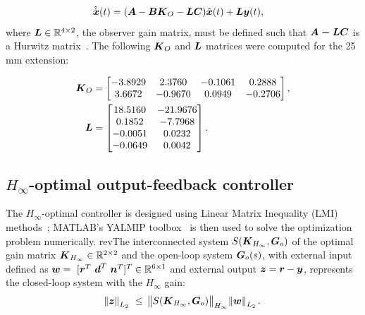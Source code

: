 \begin{align}
&\hat{\dot{\boldsymbol{x}}}(t)=(\boldsymbol{A}-\boldsymbol{B}\boldsymbol{K}_O-\boldsymbol{LC})\hat{\boldsymbol{x}}(t)+\boldsymbol{L}\boldsymbol{y}(t), \label{eq:obs-estimate}
\end{align}
where $\boldsymbol{L}\in \mathbb{R}^{4\times2}$, the observer gain matrix, must be defined such that $\boldsymbol{A-LC}$ is a Hurwitz matrix~\cite{Aastrom2010}.
The following $\boldsymbol{K}_O$ and $\boldsymbol{L}$ matrices were computed for the 25\,mm extension: 

\begin{align*}
\boldsymbol{K}_O &=\begin{bmatrix}  
            -3.8929  & 2.3760   &  -0.1061  &  0.2888\\
             3.6672  & -0.9670  &   0.0949  & -0.2706
    \end{bmatrix},\\
\boldsymbol{L} &=\begin{bmatrix}
           18.5160 &  -21.9676\\   
            0.1852 &  -7.7968\\
           -0.0051 &   0.0232\\
           -0.0649 &   0.0042\\
    \end{bmatrix}.
\end{align*}

\subsection{$H_\infty$-optimal output-feedback controller}

The $H_\infty$-optimal controller is designed using Linear Matrix Inequality (LMI) methods~\cite{Duan2013a,Boyd1994}; MATLAB's YALMIP toolbox~\cite{Lofberg2004} is then used to solve the optimization problem numerically. rev{The interconnected system $S(\boldsymbol{K}_{H_{\infty}},\boldsymbol{G}_o)$ of the optimal gain matrix $\boldsymbol{K}_{H_{\infty}}\in \mathbb{R}^{2\times2}$ and the open-loop system $\boldsymbol{G}_o(s)$, with external input defined as $\boldsymbol{w}=~[\boldsymbol{r}^T~\boldsymbol{d}^T~\boldsymbol{n}^T]^T \in \mathbb{R}^{6\times1}$ and external output $\boldsymbol{z}=\boldsymbol{r}-\boldsymbol{y}$, represents the closed-loop system with the ${H_{\infty}}$ gain:} \vspace{2mm}
\begin{align}
\norm{\boldsymbol{z}}_{L_2} ~\leq~ \norm{S(\boldsymbol{K}_{H_{\infty}},\boldsymbol{G}_o)}_{H_{\infty}} \norm{\boldsymbol{w}}_{L_2}.
\end{align}

